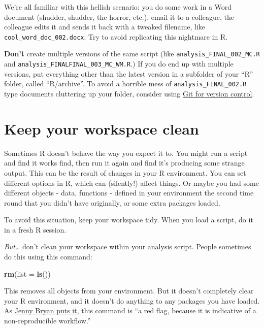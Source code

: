 \documentclass[]{book}
\newenvironment{Shaded}{\begin{snugshade}}{\end{snugshade}}
\newcommand{\DataTypeTok}[1]{\textcolor[rgb]{0.13,0.29,0.53}{#1}}
\newcommand{\KeywordTok}[1]{\textcolor[rgb]{0.13,0.29,0.53}{\textbf{#1}}}
\newcommand{\NormalTok}[1]{#1}
\begin{document}
We're all familiar with this hellish scenario: you do some work in a Word document (shudder, shudder, the horror, etc.), email it to a colleague, the colleague edits it and sends it back with a tweaked filename, like \texttt{cool\_word\_doc\_002.docx}. Try to avoid replicating this nightmare in R.

\textbf{Don't} create multiple versions of the same script (like \texttt{analysis\_FINAL\_002\_MC.R} and \texttt{analysis\_FINALFINAL\_003\_MC\_WM.R}.) If you do end up with multiple versions, put everything other than the latest version in a subfolder of your ``R'' folder, called ``R/archive''. To avoid a horrible mess of \texttt{analysis\_FINAL\_002.R} type documents cluttering up your folder, consider using \protect\hyperlink{version-control}{Git for version control}.

\hypertarget{clean-workspace}{%
\section{Keep your workspace clean}\label{clean-workspace}}

Sometimes R doesn't behave the way you expect it to. You might run a script and find it works find, then run it again and find it's producing some strange output. This can be the result of changes in your R environment. You can set different options in R, which can (silently!) affect things. Or maybe you had some different objects - data, functions - defined in your environment the second time round that you didn't have originally, or some extra packages loaded.

To avoid this situation, keep your workspace tidy. When you load a script, do it in a fresh R session.

\emph{But}\ldots{} don't clean your workspace within your analysis script. People sometimes do this using this command:

\begin{Shaded}
\begin{Highlighting}[]
\KeywordTok{rm}\NormalTok{(}\DataTypeTok{list =} \KeywordTok{ls}\NormalTok{())}
\end{Highlighting}
\end{Shaded}

This removes all objects from your environment. But it doesn't completely clear your R environment, and it doesn't do anything to any packages you have loaded. As \href{https://rstats.wtf/save-source.html\#rm-list-ls}{Jenny Bryan puts it}, this command is ``a red flag, because it is indicative of a non-reproducible workflow.''
\end{document}

